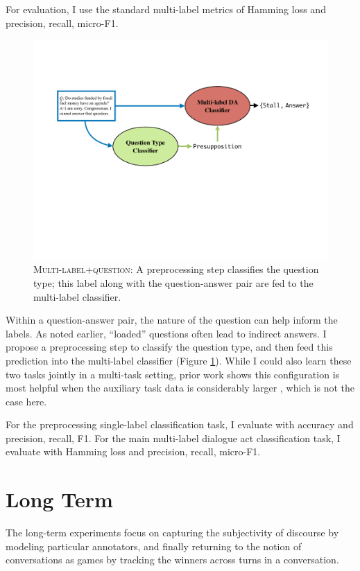 For evaluation, I use the standard multi-label metrics of Hamming loss and precision, recall, micro-F1.

\begin{figure}
\centering
\includegraphics[width=\columnwidth]{plots/multilabel_question.pdf}
\caption{\textsc{Multi-label+question}: A preprocessing step classifies the question type; this label along with the question-answer pair are fed to the multi-label classifier.}
\label{fig:multilabel_question}
\vspace{-1em}
\end{figure}

 Within a question-answer pair, the nature of the question can help inform the labels. As noted earlier, ``loaded'' questions often lead to indirect answers. I propose a preprocessing step to classify the question type, and then feed this prediction into the multi-label classifier (Figure \ref{fig:multilabel_question}). While I could also learn these two tasks jointly in a multi-task setting, prior work shows this configuration is most helpful when the auxiliary task data is considerably larger \cite{Luong:2015}, which is not the case here. 

For the preprocessing single-label classification task, I evaluate with accuracy and precision, recall, F1. For the main multi-label dialogue act classification task, I evaluate with Hamming loss and precision, recall, micro-F1. 


\section{Long Term} 
The long-term experiments focus on capturing the subjectivity of discourse by modeling particular annotators, and finally returning to the notion of conversations as games by tracking the winners across turns in a conversation.

